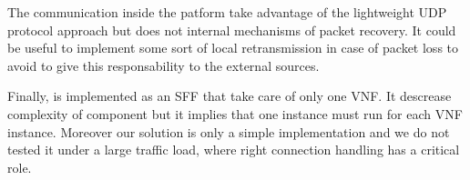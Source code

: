 The communication inside the patform take advantage of the lightweight UDP
protocol approach but does not internal mechanisms of packet recovery. It could
be useful to implement some sort of local retransmission in case of packet loss
to avoid to give this responsability to the external sources.

Finally, \astaire{} is implemented as an SFF that take care of only one VNF. It
descrease complexity of component but it implies that one \astaire{} instance
must run for each VNF instance. Moreover our solution is only a simple
implementation and we do not tested it under a large traffic load, where right
connection handling has a critical role.

